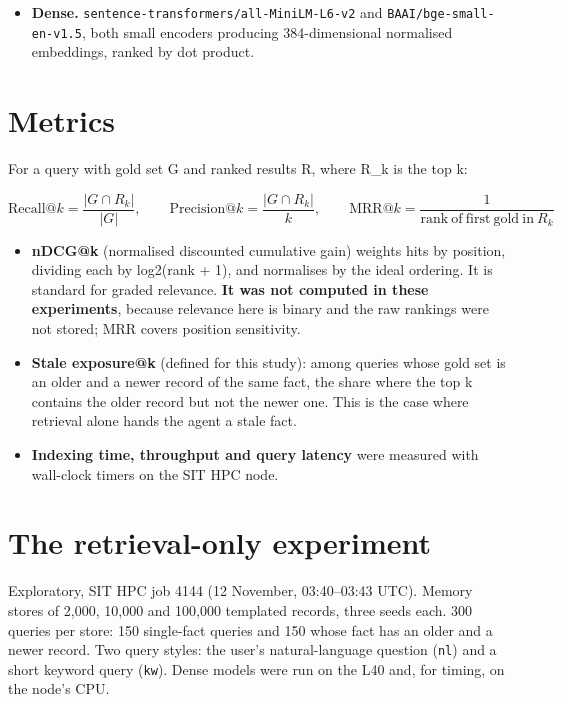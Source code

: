\documentclass[10.5pt,a4paper,oneside]{report}
\begin{document}
\begin{itemize}
\item \textbf{Dense.} \texttt{sentence-transformers/\allowbreak{}all-MiniLM-L6-v2} and \texttt{BAAI/\allowbreak{}bge-small-en-v1.\allowbreak{}5}, both small encoders producing 384-dimensional normalised embeddings, ranked by dot product.
\end{itemize}
\section{Metrics}
For a query with gold set G and ranked results R, where R\_k is the top k:

\begin{equation*}\mathrm{Recall@}k = \frac{|G \cap R_k|}{|G|}, \qquad \mathrm{Precision@}k = \frac{|G \cap R_k|}{k}, \qquad \mathrm{MRR@}k = \frac{1}{\mathrm{rank\ of\ first\ gold\ in\ } R_k}\end{equation*}
\begin{itemize}
\item \textbf{nDCG@k} (normalised discounted cumulative gain) weights hits by position, dividing each by log2(rank + 1), and normalises by the ideal ordering. It is standard for graded relevance. \textbf{It was not computed in these experiments}, because relevance here is binary and the raw rankings were not stored; MRR covers position sensitivity.
\item \textbf{Stale exposure@k} (defined for this study): among queries whose gold set is an older and a newer record of the same fact, the share where the top k contains the older record but not the newer one. This is the case where retrieval alone hands the agent a stale fact.
\item \textbf{Indexing time, throughput and query latency} were measured with wall-clock timers on the SIT HPC node.
\end{itemize}
\section{The retrieval-only experiment}
Exploratory, SIT HPC job 4144 (12 November, 03:40–03:43 UTC). Memory stores of 2,000, 10,000 and 100,000 templated records, three seeds each. 300 queries per store: 150 single-fact queries and 150 whose fact has an older and a newer record. Two query styles: the user's natural-language question (\texttt{nl}) and a short keyword query (\texttt{kw}). Dense models were run on the L40 and, for timing, on the node's CPU.
\end{document}
